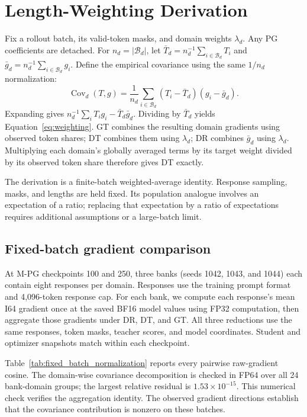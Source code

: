 \section{Length-Weighting Derivation}
\label{app:normalization}

Fix a rollout batch, its valid-token masks, and domain weights $\lambda_d$. Any PG coefficients are detached. For $n_d=|\mathcal B_d|$, let $\bar T_d=n_d^{-1}\sum_{i\in\mathcal B_d}T_i$ and $\bar g_d=n_d^{-1}\sum_{i\in\mathcal B_d}g_i$. Define the empirical covariance using the same $1/n_d$ normalization:
\begin{equation}
\operatorname{Cov}_d(T,g)=\frac{1}{n_d}\sum_{i\in\mathcal B_d}(T_i-\bar T_d)(g_i-\bar g_d).
\end{equation}
Expanding gives $n_d^{-1}\sum_iT_i g_i-\bar T_d\bar g_d$. Dividing by $\bar T_d$ yields Equation~\ref{eq:weighting}. GT combines the resulting domain gradients using observed token shares; DT combines them using $\lambda_d$; DR combines $\bar g_d$ using $\lambda_d$. Multiplying each domain's globally averaged terms by its target weight divided by its observed token share therefore gives DT exactly.

The derivation is a finite-batch weighted-average identity. Response sampling, masks, and lengths are held fixed. Its population analogue involves an expectation of a ratio; replacing that expectation by a ratio of expectations requires additional assumptions or a large-batch limit.

\subsection{Fixed-batch gradient comparison}
\label{app:fixed_batch_normalization}

At M-PG checkpoints 100 and 250, three banks (seeds 1042, 1043, and 1044) each contain eight responses per domain. Responses use the training prompt format and 4,096-token response cap. For each bank, we compute each response's mean I64 gradient once at the saved BF16 model values using FP32 computation, then aggregate those gradients under DR, DT, and GT. All three reductions use the same responses, token masks, teacher scores, and model coordinates. Student and optimizer snapshots match within each checkpoint.

Table~\ref{tab:fixed_batch_normalization} reports every pairwise raw-gradient cosine. The domain-wise covariance decomposition is checked in FP64 over all 24 bank-domain groups; the largest relative residual is $1.53\times10^{-15}$. This numerical check verifies the aggregation identity. The observed gradient directions establish that the covariance contribution is nonzero on these batches.


